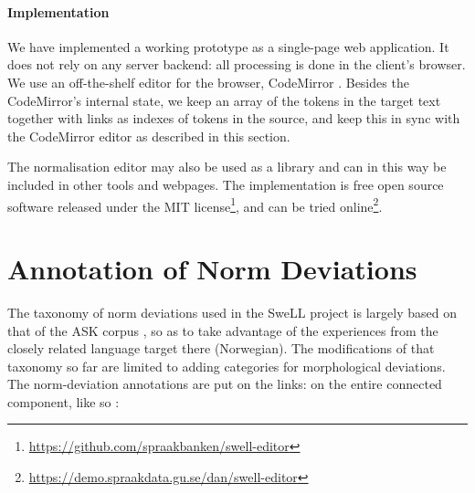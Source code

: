 \documentclass[10pt, a4paper]{article}
\newcommand{\dan}[1]{{\color{Fuchsia}{Dan: #1}}}
\newcommand{\elena}[1]{{\color{BrickRed}{Elena: #1}}}
\newcommand{\mats}[1]{{\color{Blue}{Mats: #1}}}
\begin{document}
\paragraph{Implementation}
We have implemented a working prototype as a single-page web application.
It does not rely on any server backend: all processing is done in the
client's browser. We use an off-the-shelf editor for the browser,
CodeMirror \cite{CodeMirror}.
Besides the CodeMirror's internal state, we keep an array of the tokens in the
target text together with links as indexes of tokens in the source,
and keep this in sync with the CodeMirror editor as described in this section.

The normalisation editor may also be used as a library and can in this way
be included in other tools and webpages.
The implementation is free open source software released under the
MIT license\footnote{\url{https://github.com/spraakbanken/swell-editor}},
and can be tried online\footnote{\url{https://demo.spraakdata.gu.se/dan/swell-editor}}.


\section{Annotation of Norm Deviations}
\label{sec:ann_tool}

The taxonomy of norm deviations used in the SweLL project is largely based on that of the ASK corpus \cite{tenfjord2006ask}, so as to take advantage of the experiences from the closely related language target there (Norwegian). The modifications of that taxonomy so far are limited to adding categories for morphological deviations.
The norm-deviation annotations are put on the links: \mats{Clarify if this is about what is added graphically by the annotator or if it is about the representation, or both.}
on the entire connected component, like so \dan{in ascii art for now}:
\end{document}
